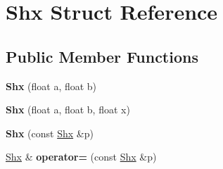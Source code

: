 \hypertarget{structShx}{}\section{Shx Struct Reference}
\label{structShx}
\subsection*{Public Member Functions}
\begin{DoxyCompactItemize}
\item 
{\bfseries Shx} (float a, float b)\hypertarget{structShx_a2bc24487edb501fd9af9b7d518b7c156}{}\label{structShx_a2bc24487edb501fd9af9b7d518b7c156}

\item 
{\bfseries Shx} (float a, float b, float x)\hypertarget{structShx_acae4c851978ee774f9e3d32fd6a6f3ed}{}\label{structShx_acae4c851978ee774f9e3d32fd6a6f3ed}

\item 
{\bfseries Shx} (const \hyperlink{structShx}{Shx} \&p)\hypertarget{structShx_a27b509aa13e7fb2ffd64c2cb42744460}{}\label{structShx_a27b509aa13e7fb2ffd64c2cb42744460}

\item 
\hyperlink{structShx}{Shx} \& {\bfseries operator=} (const \hyperlink{structShx}{Shx} \&p)\hypertarget{structShx_ab23e67a5f386850a26d28f74f36216ac}{}\label{structShx_ab23e67a5f386850a26d28f74f36216ac}

\end{DoxyCompactItemize}
